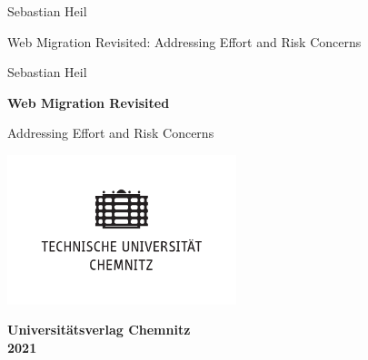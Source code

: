 \documentclass[a5paper,10pt,openright,twoside]{article}
\begin{document}
\begingroup
\pagestyle{empty}

Sebastian Heil

\vspace*{5mm}

Web Migration Revisited:  Addressing Effort and Risk Concerns

\newpage


\newpage

\begin{large}
\begin{center}

\begin{minipage}[t][50mm][t]{\textwidth}
\begin{center}

Sebastian Heil

\vspace*{7mm}

\textbf{\Large Web Migration Revisited}

\vspace*{1cm}

Addressing Effort and Risk Concerns

\end{center}
\end{minipage}

\vfill

\includegraphics[width=0.5\textwidth]{TU_Chemnitz_positiv_schwarz.pdf}

\vspace*{5mm}

\textbf{Universitätsverlag Chemnitz\\
2021}

\end{center}
\end{large}
\end{document}
